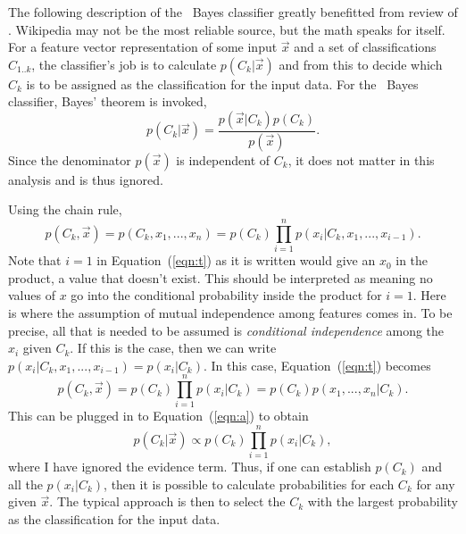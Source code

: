 The following description of the \Na\ Bayes classifier greatly benefitted from review of \cite{wiki:nb}.  Wikipedia may not be the most reliable source, but the math speaks for itself.  For a feature vector representation of some input $\vec{x}$ and a set of classifications $C_{1..k}$, the classifier's job is to calculate $p(C_k | \vec{x})$ and from this to decide which $C_k$ is to be assigned as the classification for the input data. For the \Na\ Bayes classifier, Bayes' theorem is invoked,
\begin{equation}
\label{eqn:a}
p(C_k | \vec{x}) = \frac{ p( \vec{x} | C_k) p(C_k)}{p(\vec{x})}.
\end{equation}
Since the denominator $p(\vec{x})$ is independent of $C_k$, it does not matter in this analysis and is thus ignored.

Using the chain rule,
\begin{equation}
\label{eqn:t}
p(C_k,\vec{x}) = p(C_k, x_1, ..., x_n) = p(C_k) \prod^n_{i=1}p(x_i| C_k, x_1, ..., x_{i-1}).
\end{equation}
Note that $i=1$ in Equation~(\ref{eqn:t}) as it is written would give an $x_0$ in the product, a value that doesn't exist.  This should be interpreted as meaning no values of $x$ go into the conditional probability inside the product for $i=1$.  Here is where the assumption of mutual independence among features comes in.  To be precise, all that is needed to be assumed is {\it conditional independence} among the $x_i$ given $C_k$.  If this is the case, then we can write $p(x_i|C_k,x_1,...,x_{i-1}) = p(x_i|C_k)$.  In this case, Equation~(\ref{eqn:t}) becomes
\begin{equation}
p(C_k,\vec{x}) = p(C_k) \prod^n_{i=1}p(x_i| C_k) = p(C_k)p(x_1,...,x_n|C_k).
\end{equation}
This can be plugged in to Equation~(\ref{eqn:a}) to obtain
\begin{equation}
\label{eqn:b}
p(C_k | \vec{x}) \propto p(C_k) \prod^n_{i=1}p(x_i| C_k),
\end{equation}
where I have ignored the evidence term.  Thus, if one can establish $p(C_k)$ and all the $p(x_i|C_k)$, then it is possible to calculate probabilities for each $C_k$ for any given $\vec{x}$.  The typical approach is then to select the $C_k$ with the largest probability as the classification for the input data.


